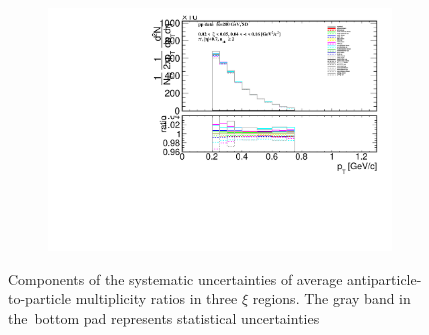 \begin{figure}[h!]
\begin{subfigure}{.49\textwidth}
			\includegraphics[width=\textwidth,page=39]{chapters/chrgSTAR/img/syst/outPID_SDT_ratio.pdf}
		\end{subfigure}
		\begin{minipage}{.49\textwidth}
			\caption{Components of the systematic uncertainties of average antiparticle-to-particle multiplicity ratios  in three $\xi$ regions. The gray band in the~bottom pad represents statistical uncertainties}
			\label{fig:results_star_syst_xi_part}
		\end{minipage}
\end{figure}


